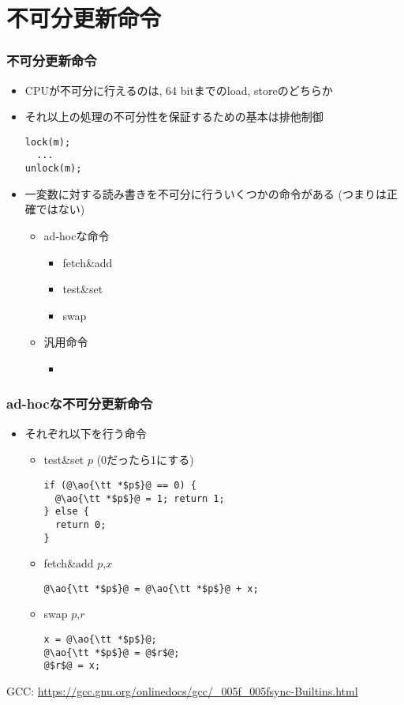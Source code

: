 \documentclass[12pt,dvipdfmx]{beamer}
\begin{document}
\section{不可分更新命令}

\begin{frame}[fragile]
  \frametitle{不可分更新命令}
  \begin{itemize}
  \item CPUが不可分に行えるのは, 64 bitまでのload, storeのどちらか\mura{($\ast$)}
  \item それ以上の処理の不可分性を保証するための基本は排他制御
\begin{lstlisting}
lock(m);
  ...      
unlock(m);
\end{lstlisting}
\item  一変数に対する読み書きを不可分に行ういくつかの命令がある
  (つまり\mura{($\ast$)}は正確ではない)
  \begin{itemize}
    \item ad-hocな命令
      \begin{itemize}
      \item fetch\&add
      \item test\&set
      \item swap
      \end{itemize}
    \item 汎用命令
      \begin{itemize}
      \item {}
      \end{itemize}
  \end{itemize}
  \end{itemize}
\end{frame}

\begin{frame}[fragile]
  \frametitle{ad-hocな不可分更新命令}
  \begin{itemize}
  \item [] それぞれ以下を行う命令
    \begin{itemize}
    \item test\&set $p$ (0だったら1にする)
\begin{lstlisting}
if (@\ao{\tt *$p$}@ == 0) {
  @\ao{\tt *$p$}@ = 1; return 1;
} else {
  return 0;
}
\end{lstlisting}

\item fetch\&add $p$,$x$ 
\begin{lstlisting}
@\ao{\tt *$p$}@ = @\ao{\tt *$p$}@ + x;
\end{lstlisting}

\item swap $p$,$r$
\begin{lstlisting}
x = @\ao{\tt *$p$}@;
@\ao{\tt *$p$}@ = @$r$@;
@$r$@ = x;
\end{lstlisting}
    \end{itemize}
  \end{itemize}

{\scriptsize GCC: \url{https://gcc.gnu.org/onlinedocs/gcc/_005f_005fsync-Builtins.html}}
\end{frame}
\end{document}
